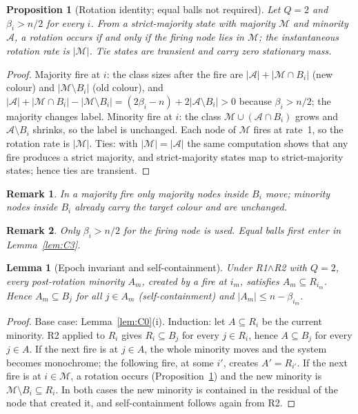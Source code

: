 \documentclass[pdflatex,sn-mathphys-num]{sn-jnl}
\theoremstyle{thmstyleone}%
\newtheorem{lemma}[theorem]{Lemma}
\newtheorem{proposition}[theorem]{Proposition}
\theoremstyle{thmstylethree}%
\theoremstyle{thmstyletwo}%
\newtheorem{remark}{Remark}[theorem]
\begin{document}
\begin{proposition}[Rotation identity; equal balls not required]
\label{prop:C1}
Let $Q=2$ and $\beta_i>n/2$ for every $i$. From a strict-majority state
with majority $\mathcal M$ and minority $\mathcal A$, a rotation occurs if
and only if the firing node lies in $\mathcal M$; the instantaneous
rotation rate is $|\mathcal M|$. Tie states are transient and carry zero
stationary mass.
\end{proposition}
\begin{proof}
Majority fire at $i$: the class sizes after the fire are
$|\mathcal A|+|\mathcal M\cap B_i|$ (new colour) and
$|\mathcal M\setminus B_i|$ (old colour), and
$|\mathcal A|+|\mathcal M\cap B_i|-|\mathcal M\setminus B_i|
=(2\beta_i-n)+2|\mathcal A\setminus B_i|>0$ because $\beta_i>n/2$; the
majority changes label. Minority fire at $i$: the class
$\mathcal M\cup(\mathcal A\cap B_i)$ grows and
$\mathcal A\setminus B_i$ shrinks, so the label is unchanged. Each node of
$\mathcal M$ fires at rate~1, so the rotation rate is $|\mathcal M|$.
Ties: with $|\mathcal M|=|\mathcal A|$ the same computation shows that any
fire produces a strict majority, and strict-majority states map to
strict-majority states; hence ties are transient.
\end{proof}
\begin{remark}
\label{rem:C1.1}
In a majority fire only majority nodes inside $B_i$ move; minority nodes
inside $B_i$ already carry the target colour and are unchanged.
\end{remark}
\begin{remark}
\label{rem:C1.2}
Only $\beta_i>n/2$ for the firing node is used. Equal balls first enter
in Lemma~\ref{lem:C3}.
\end{remark}

\begin{lemma}[Epoch invariant and self-containment]
\label{lem:C2}
Under R1$\wedge$R2 with $Q=2$, every post-rotation minority $A_m$, created
by a fire at $i_m$, satisfies $A_m\subseteq R_{i_m}$. Hence
$A_m\subseteq B_j$ for all $j\in A_m$ (self-containment) and
$|A_m|\le n-\beta_{i_m}$.
\end{lemma}
\begin{proof}
Base case: Lemma~\ref{lem:C0}(i). Induction: let $A\subseteq R_i$ be the
current minority. R2 applied to $R_i$ gives $R_i\subseteq B_j$ for every
$j\in R_i$, hence $A\subseteq B_j$ for every $j\in A$. If the next fire is
at $j\in A$, the whole minority moves and the system becomes monochrome;
the following fire, at some $i'$, creates $A'=R_{i'}$. If the next fire
is at $i\in\mathcal M$, a rotation occurs (Proposition~\ref{prop:C1}) and
the new minority is $\mathcal M\setminus B_i\subseteq R_i$. In both cases
the new minority is contained in the residual of the node that created
it, and self-containment follows again from R2.
\end{proof}
\end{document}
